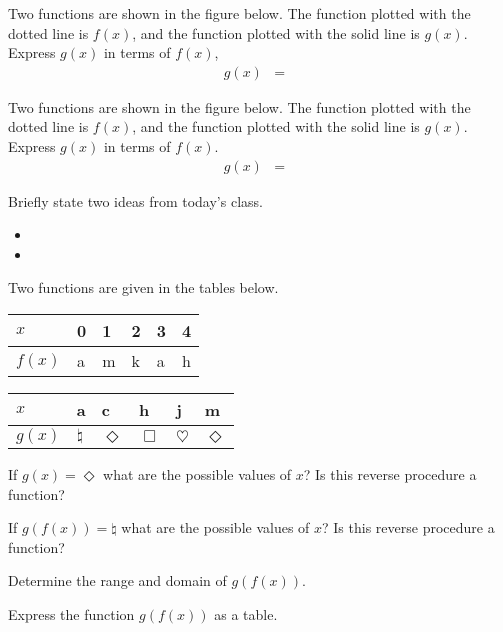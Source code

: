 \begin{problem}
  \clearpage

\item Two functions are shown in the figure below. The function
  plotted with the dotted line is $f(x)$, and the function plotted
  with the solid line is $g(x)$. Express $g(x)$ in terms of $f(x)$,
  \begin{eqnarray*}
    g(x) & = & 
  \end{eqnarray*}

  \hspace*{-6em}
  \scalebox{0.95}{}

  \clearpage

\item Two functions are shown in the figure below. The function
  plotted with the dotted line is $f(x)$, and the function plotted
  with the solid line is $g(x)$. Express $g(x)$ in terms of $f(x)$.
  \begin{eqnarray*}
    g(x) & = & 
  \end{eqnarray*}

  \hspace*{-6em}
  \scalebox{0.95}{}


\end{problem}

\postClass

\begin{problem}
\item Briefly state two ideas from today's class.
  \begin{itemize}
  \item 
  \item 
  \end{itemize}

\item Two functions are given in the tables below.

  \begin{tabular}[h]{l||l|l|l|l|l}
    $x$    & 0 & 1 & 2 & 3 & 4 \\ \hline
    $f(x)$ & a & m & k & a & h \\
  \end{tabular}

  \begin{tabular}[h]{l||l|l|l|l|l}
    $x$    & a & c & h & j & m \\ \hline
    $g(x)$ & $\natural$ & $\Diamond$ & $\Box$ & $\heartsuit$ & $\Diamond$ \\
  \end{tabular}

  \begin{subproblem}
  \item If $g(x)=\Diamond$ what are the possible values of $x$? Is
    this reverse procedure a function?
  \item If $g(f(x))=\natural$ what are the possible values of $x$? Is
    this reverse procedure a function?
  \item Determine the range and domain of $g(f(x))$.
  \item Express the function $g(f(x))$ as a table.
  \end{subproblem}

\end{problem}



